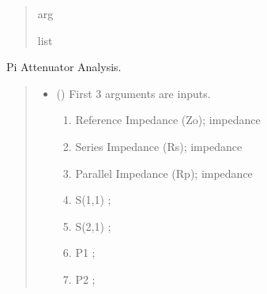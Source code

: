 \documentclass[letterpaper,10pt,english]{sphinxmanual}
\begin{document}
\begin{fulllineitems}
\begin{quote}
\begin{description}
\begin{itemize}
\end{itemize}

\sphinxAtStartPar
arg

\sphinxAtStartPar
list

\end{description}\end{quote}

\end{fulllineitems}


\begin{fulllineitems}
\label{\detokenize{components:components.Pi_Attenuator_Analysis}}
\pysigstartsignatures
{}
\pysigstopsignatures
\sphinxAtStartPar
Pi Attenuator Analysis.
\begin{quote}\begin{description}
\begin{itemize}
\item {}
\sphinxAtStartPar
{} () \textendash{}
\sphinxAtStartPar
First 3 arguments are inputs.
\begin{enumerate}
%
\item {}
\sphinxAtStartPar
Reference Impedance (Zo); impedance

\item {}
\sphinxAtStartPar
Series Impedance (Rs); impedance

\item {}
\sphinxAtStartPar
Parallel Impedance (Rp); impedance

\item {}
\sphinxAtStartPar
S(1,1) ;

\item {}
\sphinxAtStartPar
S(2,1) ;

\item {}
\sphinxAtStartPar
P1 ;

\item {}
\sphinxAtStartPar
P2 ;

\end{enumerate}


\end{itemize}
\end{description}
\end{quote}
\end{fulllineitems}
\end{document}
